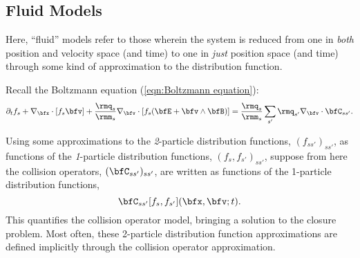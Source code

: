 \subsection{Fluid Models}\label{cha:fluid models}

    \line

    \begin{definition}\label{def:fluid model}
        Here, ``fluid'' models refer to those wherein the system is reduced from one in \emph{both} position and velocity space (and time) to one in \emph{just} position space (and time) through some kind of approximation to the distribution function.
    \end{definition}

    \line
    
    Recall the Boltzmann equation (\ref{eqn:Boltzmann equation}):
    \begin{equation*}
        \partial_{t}f_{s} + \nabla_{\bfx}\cdot[f_{s}\bfv] + \frac{\rmq_{s}}{\rmm_{s}}\nabla_{\bfv}\cdot[f_{s}(\bfE + \bfv\wedge\bfB)]  =  \frac{\rmq_{s}}{\rmm_{s}}\sum_{s'}\rmq_{s'}\nabla_{\bfv}\cdot\bfC_{ss'}.
    \end{equation*}
    
    Using some approximations to the \emph{2}-particle distribution functions, $(f_{ss'})_{ss'}$, as functions of the \emph{1}-particle distribution functions, $(f_{s}, f_{s'})_{ss'}$, suppose from here the collision operators, $(\bfC_{ss'})_{ss'}$, are written as functions of the 1-particle distribution functions,
    \begin{equation}
        \bfC_{ss'}[f_{s}, f_{s'}](\bfx, \bfv; t).
    \end{equation}
    This quantifies the collision operator model, bringing a solution to the closure problem. Most often, these 2-particle distribution function approximations are defined implicitly through the collision operator approximation.


    
    
    
    
    